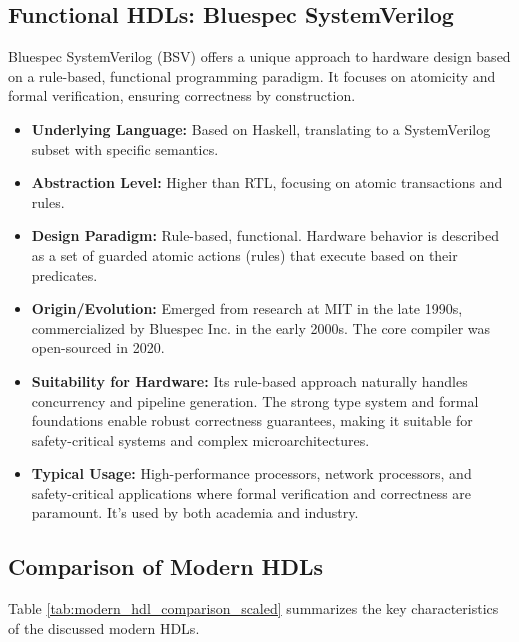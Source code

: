 \documentclass[sigconf, anonymous=false]{acmart} %
\begin{document}
\subsection{Functional HDLs: Bluespec SystemVerilog}
Bluespec SystemVerilog (BSV) offers a unique approach to hardware design based on a rule-based, functional programming paradigm. It focuses on atomicity and formal verification, ensuring correctness by construction.
\begin{itemize}
    \item \textbf{Underlying Language:} Based on Haskell, translating to a SystemVerilog subset with specific semantics.
    \item \textbf{Abstraction Level:} Higher than RTL, focusing on atomic transactions and rules.
    \item \textbf{Design Paradigm:} Rule-based, functional. Hardware behavior is described as a set of guarded atomic actions (rules) that execute based on their predicates.
    \item \textbf{Origin/Evolution:} Emerged from research at MIT in the late 1990s, commercialized by Bluespec Inc. in the early 2000s. The core compiler was open-sourced in 2020.
    \item \textbf{Suitability for Hardware:} Its rule-based approach naturally handles concurrency and pipeline generation. The strong type system and formal foundations enable robust correctness guarantees, making it suitable for safety-critical systems and complex microarchitectures.
    \item \textbf{Typical Usage:} High-performance processors, network processors, and safety-critical applications where formal verification and correctness are paramount. It's used by both academia and industry.
\end{itemize}

\subsection{Comparison of Modern HDLs}
Table \ref{tab:modern_hdl_comparison_scaled} summarizes the key characteristics of the discussed modern HDLs.
\end{document}
